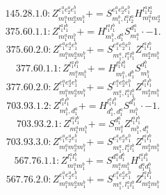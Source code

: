 \documentclass[letterpaper,10pt,fleqn,leqno,onecolumn]{article}
\begin{document}
\begin{equation} \;\;\;\;\;\;  145.28.1.0: Z^{e_{1}^{a}e_{2}^{a}e_{1}^{b}}_{m_{1}^{a}m_{2}^{a}m_{1}^{b}}+=S^{e_{1}^{a}e_{2}^{a}e_{1}^{b}}_{m_{1}^{b},l_{1}^{a}l_{2}^{a}}H^{l_{1}^{a}l_{2}^{a}}_{m_{1}^{a}m_{2}^{a}} \end{equation}
\begin{equation} \;\;\;\;\;\;  375.60.1.1: Z^{l_{1}^{a}l_{1}^{b}}_{m_{1}^{a}m_{1}^{b}}+=H^{l_{1}^{a}l_{1}^{b}}_{m_{1}^{b},d_{1}^{a}}S^{d_{1}^{a}}_{m_{1}^{a}}\cdot -1. \end{equation}
\begin{equation} \;\;\;\;\;\;  375.60.2.0: Z^{e_{1}^{a}e_{2}^{a}e_{1}^{b}}_{m_{1}^{a}m_{2}^{a}m_{1}^{b}}+=S^{e_{1}^{a}e_{2}^{a}e_{1}^{b}}_{m_{1}^{a},l_{1}^{a}l_{1}^{b}}Z^{l_{1}^{a}l_{1}^{b}}_{m_{2}^{a}m_{1}^{b}} \end{equation}
\begin{equation} \;\;\;\;\;\;  377.60.1.1: Z^{l_{1}^{a}l_{1}^{b}}_{m_{1}^{a}m_{1}^{b}}+=H^{l_{1}^{a}l_{1}^{b}}_{m_{1}^{a},d_{1}^{b}}S^{d_{1}^{b}}_{m_{1}^{b}} \end{equation}
\begin{equation} \;\;\;\;\;\;  377.60.2.0: Z^{e_{1}^{a}e_{2}^{a}e_{1}^{b}}_{m_{1}^{a}m_{2}^{a}m_{1}^{b}}+=S^{e_{1}^{a}e_{2}^{a}e_{1}^{b}}_{m_{1}^{a},l_{1}^{a}l_{1}^{b}}Z^{l_{1}^{a}l_{1}^{b}}_{m_{2}^{a}m_{1}^{b}} \end{equation}
\begin{equation} \;\;\;\;\;\;  703.93.1.2: Z^{l_{1}^{a}l_{1}^{b}}_{m_{1}^{b},d_{1}^{a}}+=H^{l_{1}^{a}l_{1}^{b}}_{d_{1}^{b},d_{1}^{a}}S^{d_{1}^{b}}_{m_{1}^{b}}\cdot -1. \end{equation}
\begin{equation} \;\;\;\;\;\;  703.93.2.1: Z^{l_{1}^{a}l_{1}^{b}}_{m_{1}^{a}m_{1}^{b}}+=S^{d_{1}^{a}}_{m_{1}^{a}}Z^{l_{1}^{a}l_{1}^{b}}_{m_{1}^{b},d_{1}^{a}} \end{equation}
\begin{equation} \;\;\;\;\;\;  703.93.3.0: Z^{e_{1}^{a}e_{2}^{a}e_{1}^{b}}_{m_{1}^{a}m_{2}^{a}m_{1}^{b}}+=S^{e_{1}^{a}e_{2}^{a}e_{1}^{b}}_{m_{1}^{a},l_{1}^{a}l_{1}^{b}}Z^{l_{1}^{a}l_{1}^{b}}_{m_{2}^{a}m_{1}^{b}} \end{equation}
\begin{equation} \;\;\;\;\;\;  567.76.1.1: Z^{l_{1}^{a}l_{1}^{b}}_{m_{1}^{a}m_{1}^{b}}+=S^{d_{1}^{a}d_{1}^{b}}_{m_{1}^{a}m_{1}^{b}}H^{l_{1}^{a}l_{1}^{b}}_{d_{1}^{a}d_{1}^{b}} \end{equation}
\begin{equation} \;\;\;\;\;\;  567.76.2.0: Z^{e_{1}^{a}e_{2}^{a}e_{1}^{b}}_{m_{1}^{a}m_{2}^{a}m_{1}^{b}}+=S^{e_{1}^{a}e_{2}^{a}e_{1}^{b}}_{m_{1}^{a},l_{1}^{a}l_{1}^{b}}Z^{l_{1}^{a}l_{1}^{b}}_{m_{2}^{a}m_{1}^{b}} \end{equation}
\end{document}
